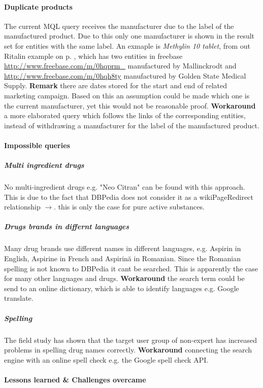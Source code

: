 \documentclass[11pt,titlepage,oneside,openany]{book}
\begin{document}
\paragraph{Duplicate products}
\label{limitations:dubplicates} 
The current MQL query receives the manufacturer due to the label of the manufactured product. Due to this only one manufacturer is shown in the result set for entities with the same label. An exmaple is \textit{Methylin 10 tablet}, from out Ritalin example on  p. \pageref{example:ritalin}, which has two entities in freebase \url{http://www.freebase.com/m/0hqprm_} manufactured by Mallinckrodt and \url{http://www.freebase.com/m/0hqh8ty} manufactured by Golden State Medical Supply. \textbf{Remark} there are dates stored for the start and end of related marketing campaign. Based on this an assumption could be made which one is the current manufacturer, yet this would not be reasonable proof. \textbf{Workaround} a more elaborated query which follows the links of the corresponding entities, instead of withdrawing a manufacturer for the label of the manufactured product.


\paragraph{Impossible queries}
\label{drug_cocktail}
\subparagraph{Multi ingredient drugs} No multi-ingredient drugs e.g. "Neo Citran" can be found with this approach. This is due to the fact that DBPedia does not consider it as a wikiPageRedirect relationship $\rightarrow$. this is only the case for pure active substances.

\subparagraph{Drugs brands in differnt languages}
\label{drug_foregin_name}
Many drug brands use different names in different languages, e.g. Aspirin in English, Aspirine in French and Aspirin\u{a} in Romanian. Since the Romanian spelling is not known to DBPedia it cant be searched. This is apparently the case for many other languages and drugs. \textbf{Workaround} the search term could be send to an online dictionary, which is able to identify languages e.g. Google translate.

\subparagraph{Spelling}
\label{drug_spellcheck}
The field study has shown that the target user group of non-expert has increased problems in spelling drug names correctly. \textbf{Workaround} connecting the search engine with an online spell check e.g. the Google spell check API.



\paragraph{Lessons learned \& Challenges overcame}
\label{cha:lessons}
\end{document}
